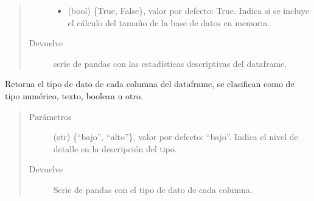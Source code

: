 \documentclass[letterpaper,10pt,openany,spanish]{sphinxmanual}
\begin{document}
\begin{fulllineitems}
\begin{fulllineitems}
\begin{quote}
\begin{description}
\begin{itemize}
\item {} 
 \textendash{} (bool) \{True, False\}, valor por defecto: True.             Indica si se incluye el cálculo del tamaño de la base de datos en memoria.

\end{itemize}

\item[{Devuelve}] \leavevmode
serie de pandas con las estadísticas descriptivas del dataframe.

\end{description}\end{quote}

\end{fulllineitems}


\begin{fulllineitems}
\label{\detokenize{calidad_datos:calidad_datos.CalidadDatos.TipoColumnas}}
Retorna el tipo de dato de cada columna del dataframe, se             clasifican como de tipo numérico, texto, boolean u otro.
\begin{quote}\begin{description}
\item[{Parámetros}] \leavevmode
{} \textendash{} (str) \{“bajo”, “alto”\}, valor por defecto: “bajo”.             Indica el nivel de detalle en la descripción del tipo.

\item[{Devuelve}] \leavevmode
Serie de pandas con el tipo de dato de cada columna.

\end{description}\end{quote}

\end{fulllineitems}



\end{fulllineitems}
\end{document}
